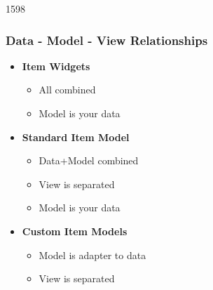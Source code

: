 \begin{slide}{1598}
  \frametitle{Data - Model - View Relationships}
  \begin{itemize}
  \item \textbf{Item Widgets}
    \begin{itemize}
    \item All combined
    \item Model is your data
    \end{itemize}
 \end{itemize}

  
  \begin{itemize}
  \item \textbf{Standard Item Model}
    \begin{itemize}
    \item Data+Model combined
    \item View is separated
    \item Model is your data
    \end{itemize}
 \end{itemize}
 \begin{itemize}
 \item \textbf{Custom Item Models}
    \begin{itemize}
    \item Model is adapter to data
    \item View is separated
    \end{itemize}
 \end{itemize}
\end{slide}



